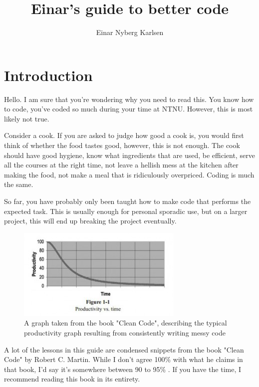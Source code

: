 \documentclass[10pt,a4paper]{article}
\title{Einar's guide to better code}
\author{Einar Nyberg Karlsen}
\begin{document}
\lstset{language=Python, 
		showstringspaces=false,
		basicstyle=\ttfamily\small}
		
\maketitle

\tableofcontents

\newpage

\section{Introduction}
Hello. I am sure that you're wondering why you need to read this. You know how to code, you've coded so much during your time at NTNU. However, this is most likely not true. 

Consider a cook. If you are asked to judge how good a cook is, you would first think of whether the food tastes good, however, this is not enough. The cook should have good hygiene, know what ingredients that are used, be efficient, serve all the courses at the right time, not leave a hellish mess at the kitchen after making the food, not make a meal that is ridiculously overpriced. Coding is much the same. 

So far, you have probably only been taught how to make code that performs the expected task. This is usually enough for personal sporadic use, but on a larger project, this will end up breaking the project eventually.

\begin{center}
\begin{figure}[H]
\label{cleanCodeEfficiency}
\includegraphics[scale=1]{clean-code-productivity-300x166.jpg}
\caption{A graph taken from the book "Clean Code", describing the typical productivity graph resulting from consistently writing messy code} 
\end{figure}
\end{center}

A lot of the lessons in this guide are condensed snippets from the book "Clean Code" by Robert C. Martin. While I don't agree 100\% with what he claims in that book, I'd say it's somewhere between 90 to 95\% . If you have the time, I recommend reading this book in its entirety. 
\end{document}
